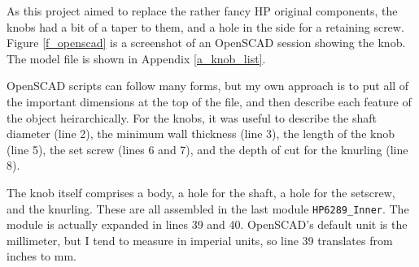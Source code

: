 \documentclass[12pt]{article}
\begin{document}
As this project aimed to replace the rather fancy HP original components,
the knobs had a bit of a taper to them, and a hole in the side for a
retaining screw. Figure \ref{f_openscad} is a screenshot of an OpenSCAD
session showing the knob. The model file is shown in Appendix \ref{a_knob_list}.

OpenSCAD scripts can follow many forms, but my own approach is to put
all of the important dimensions at the top of the file, and then
describe each feature of the object heirarchically.  For the knobs,
it was useful to describe the shaft diameter (line 2), 
the minimum wall thickness (line 3), the length of the knob (line 5),
the set screw (lines 6 and 7), and the depth of cut for the knurling (line 8).

The knob itself comprises a body, a hole for the shaft, a hole for the
setscrew, and the knurling.  These are all assembled in the last module
{\tt HP6289\_Inner}. The module is actually expanded in lines 39 and 40.
OpenSCAD's default unit is the millimeter, but I tend to measure in
imperial units, so line 39 translates from inches to mm. 
\end{document}
